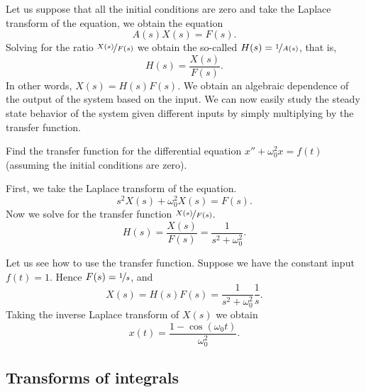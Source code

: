 \documentclass{ximera}
\begin{document}
Let us suppose that all the initial conditions are zero and take the Laplace transform of the equation, we obtain the equation
\begin{equation*}
    A(s) X(s) = F(s) .
\end{equation*}
Solving for the ratio $\nicefrac{X(s)}{F(s)}$ we obtain the so-called \emph{} $H(s) = \nicefrac{1}{A(s)}$, that is,
\begin{equation*}
    H(s) = \frac{X(s)}{F(s)} .
\end{equation*}
In other words, $X(s) = H(s) F(s)$.  We obtain an algebraic dependence of the output of the system based on the input.  We can now easily study the steady state behavior of the system given different inputs by simply multiplying by the transfer function.

\begin{example}
    Find the transfer function for the differential equation $x'' + \omega_0^2 x = f(t)$ (assuming the initial conditions are zero).
\end{example}

\begin{exampleSol}
    First, we take the Laplace transform of the equation.
    \begin{equation*}
        s^2 X(s) + \omega_0^2 X(s) = F(s) .
    \end{equation*}
    Now we solve for the transfer function $\nicefrac{X(s)}{F(s)}$.
    \begin{equation*}
        H(s) = \frac{X(s)}{F(s)} = \frac{1}{s^2 + \omega_0^2} .
    \end{equation*}
    
    Let us see how to use the transfer function.  Suppose we have the constant input $f(t) = 1$.  Hence $F(s) = \nicefrac{1}{s}$, and
    \begin{equation*}
        X(s) = H(s) F(s) = \frac{1}{s^2+\omega_0^2} \frac{1}{s} .
    \end{equation*}
    Taking the inverse Laplace transform of $X(s)$ we obtain
    \begin{equation*}
        x(t) = \frac{1-\cos(\omega_0 t)}{\omega_0^2} .
    \end{equation*}
\end{exampleSol}

\subsection{Transforms of integrals}
\end{document}
